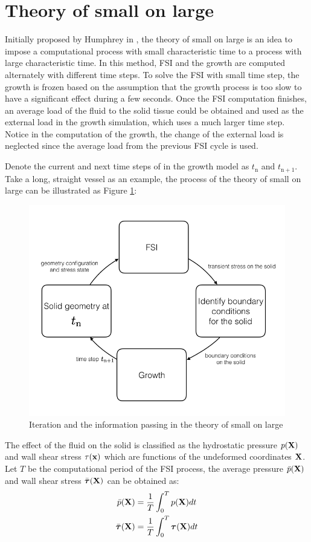\section{Theory of small on large}
Initially proposed by Humphrey in \cite{Baek}, the theory of small on large is an idea to impose a computational process with small characteristic time to a process with large characteristic time. In this method, FSI and the growth are computed alternately with different time steps. To solve the FSI with small time step, the growth is frozen based on the assumption that the growth process is too slow to have a significant effect during a few seconds. Once the FSI computation finishes, an average load of the fluid to the solid tissue could be obtained and used as the external load in the growth simulation, which uses a much larger time step. Notice in the computation of the growth, the change of the external load is neglected since the average load from the previous FSI cycle is used.

Denote the current and next time steps of in the growth model as $t_\mathrm{n}$ and $t_\mathrm{n+1}$. Take a long, straight vessel as an example, the process of the theory of small on large can be illustrated as Figure \ref{fig:smallOnLarge}:
\begin{figure}[H]
   \centering
   \includegraphics[width=.6\textwidth]{./figures/smallOnLarge.png} %
   \caption{Iteration and the information passing in the theory of small on large}
   \label{fig:smallOnLarge}
\end{figure}

The effect of the fluid on the solid is classified as the hydrostatic pressure $p(\bold{X})$ and wall shear stress $\tau(\bold{x})$ which are functions of the undeformed coordinates $\bold{X}$. Let $T$ be the computational period of the FSI process, the average pressure $\bar{p}(\bold{X})$ and wall shear stress $\bar{\boldsymbol{\tau}}(\bold{X})$ can be obtained as:
\begin{subequations}
\begin{align}
\bar{p}(\bold{X}) &= \frac{1}{T}\int_0^T p(\bold{X}) dt\\
\bar{\boldsymbol{\tau}}(\bold{X}) &= \frac{1}{T}\int_0^T \boldsymbol{\tau}(\bold{X}) dt
\end{align}
\end{subequations}

